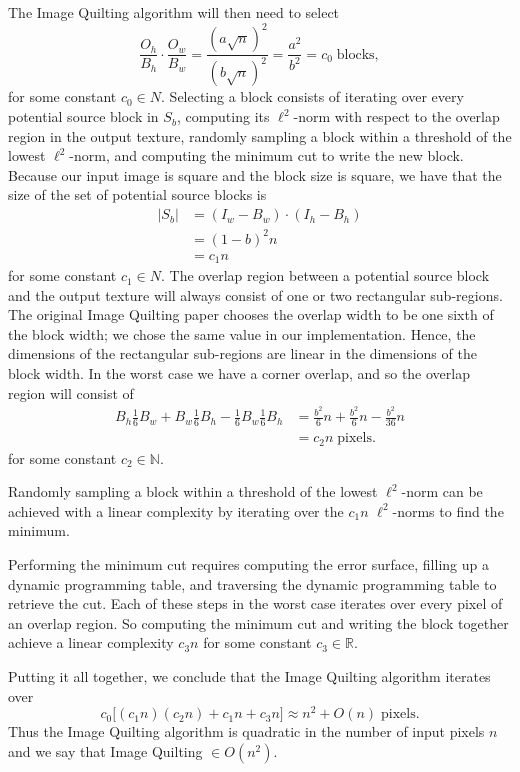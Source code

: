 \documentclass[letterpaper]{article}
\newcommand{\R}[0]{\mathbb{R}}
\newcommand{\N}[0]{\mathbb{N}}
\begin{document}
The Image Quilting algorithm will then need to select
\[
  \frac{O_h}{B_h} \cdot \frac{O_w}{B_w} = \frac{(a \sqrt{n})^2}{(b \sqrt{n})^2} = \frac{a^2}{b^2} = c_0 \; \text{blocks},
\]
for some constant $c_0 \in N$. Selecting a block consists of iterating over every potential source block in $S_b$, computing its $\ell ^2$-norm with respect to the overlap region in the output texture, randomly sampling a block within a threshold of the lowest $\ell ^2$-norm, and computing the minimum cut to write the new block. Because our input image is square and the block size is square, we have that the size of the set of potential source blocks is
\begin{align*}
  |S_b| & = (I_w - B_w) \cdot (I_h - B_h) \\
  & = (1-b) ^2 n \\
  & = c_1 n
\end{align*}
for some constant $c_1 \in N$. The overlap region between a potential source block and the output texture will always consist of one or two rectangular sub-regions. The original Image Quilting paper chooses the overlap width to be one sixth of the block width; we chose the same value in our implementation. Hence, the dimensions of the rectangular sub-regions are linear in the dimensions of the block width. In the worst case we have a corner overlap, and so the overlap region will consist of
\begin{align*}
  B_h \frac{1}{6} B_w + B_w \frac{1}{6} B_h - \frac{1}{6} B_w \frac{1}{6} B_h & = \frac{b^2}{6} n + \frac{b^2}{6} n - \frac{b^2}{36} n \\ & = c_2 n \; \text{pixels}.
\end{align*}
for some constant $c_2 \in \N$.

Randomly sampling a block within a threshold of the lowest $\ell ^2$-norm can be achieved with a linear complexity by iterating over the $c_1 n$ $\ell ^2$-norms to find the minimum.

Performing the minimum cut requires computing the error surface, filling up a dynamic programming table, and traversing the dynamic programming table to retrieve the cut. Each of these steps in the worst case iterates over every pixel of an overlap region. So computing the minimum cut and writing the block together achieve a linear complexity $c_3 n$ for some constant $c_3 \in \R$.

Putting it all together, we conclude that the Image Quilting algorithm iterates over
\[
  c_0 \big [(c_1 n)(c_2 n) + c_1 n + c_3 n \big ] \approx n^2 + O(n) \; \text{pixels}.
\]
Thus the Image Quilting algorithm is quadratic in the number of input pixels $n$ and we say that Image Quilting $ \in O(n^2)$.
\end{document}
